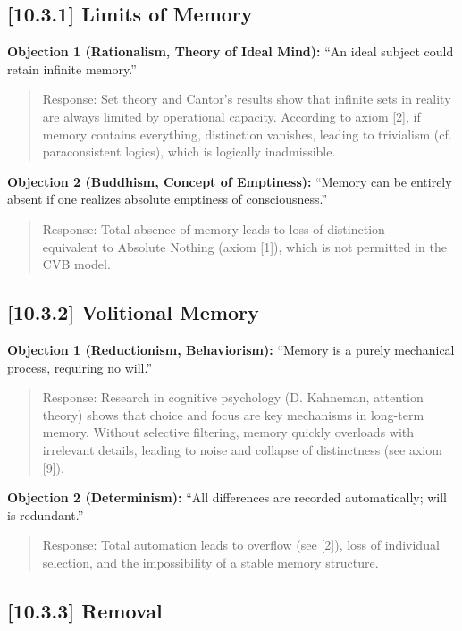 \documentclass[12pt]{article}
\begin{document}
\subsection*{[10.3.1] Limits of Memory}

\textbf{Objection 1 (Rationalism, Theory of Ideal Mind):} ``An ideal subject could retain infinite memory.''

\begin{quote}
Response: Set theory and Cantor’s results show that infinite sets in reality are always limited by operational capacity. According to axiom [2], if memory contains everything, distinction vanishes, leading to trivialism (cf. paraconsistent logics), which is logically inadmissible.
\end{quote}

\textbf{Objection 2 (Buddhism, Concept of Emptiness):} ``Memory can be entirely absent if one realizes absolute emptiness of consciousness.''

\begin{quote}
Response: Total absence of memory leads to loss of distinction — equivalent to Absolute Nothing (axiom [1]), which is not permitted in the CVB model.
\end{quote}

\bigskip
\subsection*{[10.3.2] Volitional Memory}

\textbf{Objection 1 (Reductionism, Behaviorism):} ``Memory is a purely mechanical process, requiring no will.''

\begin{quote}
Response: Research in cognitive psychology (D. Kahneman, attention theory) shows that choice and focus are key mechanisms in long-term memory. Without selective filtering, memory quickly overloads with irrelevant details, leading to noise and collapse of distinctness (see axiom [9]).
\end{quote}

\textbf{Objection 2 (Determinism):} ``All differences are recorded automatically; will is redundant.''

\begin{quote}
Response: Total automation leads to overflow (see [2]), loss of individual selection, and the impossibility of a stable memory structure.
\end{quote}

\bigskip
\subsection*{[10.3.3] Removal}
\end{document}
